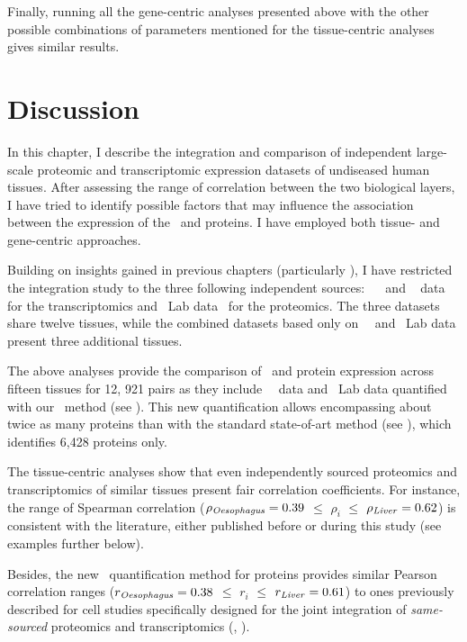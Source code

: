 Finally, running all the gene-centric analyses presented above
with the other possible combinations of parameters
mentioned for the tissue-centric analyses
gives similar results.\mybr\

\vspace{-2mm}
\section{Discussion}
\vspace{-2mm}

In this chapter,
I describe the integration and comparison of independent large-scale
proteomic and transcriptomic expression datasets
of undiseased human tissues.
After assessing the range of correlation between the two biological layers,
I have tried to identify possible factors
that may influence the association
between the expression of the \mRNAs\ and proteins.
I have employed both tissue- and gene-centric approaches.\mybr\

Building on insights gained in previous chapters
(particularly ),
I have restricted the integration study to
the three following independent sources:
\uhlen\ \etal{}~
and \gtex~ data for the transcriptomics
and \pandey\ Lab data~ for the proteomics.
The three datasets share twelve tissues,
while the combined datasets based only on \uhlen\ \etal\ and \pandey\ Lab data
present three additional tissues.\mybr\

The above analyses provide
the comparison of \mRNA\ and protein expression across fifteen tissues
for 12, 921 pairs as they include \uhlen\ \etal\ data and \pandey\ Lab data
quantified with our \PPKM\ method (see ).
This new quantification allows encompassing about twice as many proteins
than with the standard state-of-art method (see ),
which identifies 6,428 proteins only.\mybr\

The tissue-centric analyses show that
even independently sourced proteomics and transcriptomics of similar tissues
present fair correlation coefficients.
For instance, the range of Spearman correlation
($\rho_{\text{\emph{Oesophagus}}}=0.39$
$≤$ $\rho_i$ $≤$ $\rho_{\text{\emph{Liver}}}=0.62$)
is consistent with the literature,
either published before or during this study (see examples further below).\mybr\

Besides, the new \PPKM\ quantification method for proteins
provides similar Pearson correlation ranges
($r_{\text{\emph{Oesophagus}}}=0.38$ $≤$ $r_i$  $≤$ $r_{\text{\emph{Liver}}}=0.61$)
to ones previously described for cell studies specifically designed
for the joint integration of \emph{same-sourced} proteomics and transcriptomics
(\eg, \citet{Marguerat2012-sn,schwanhausserglobal:2011,Schwanhausser2013-et,Li2014-ai}).\mybr\

